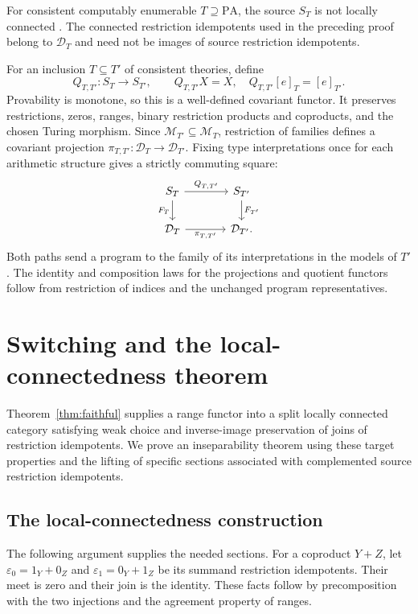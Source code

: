 \documentclass[11pt]{article}
\newcommand{\PA}{\mathrm{PA}}
\begin{document}
For consistent computably enumerable $T\supseteq\PA$, the source $S_T$
is not locally connected \cite[Corollary 4.4, pp.~657--658]{DPM}.
The connected restriction idempotents used in the preceding proof
belong to $\mathcal D_T$ and need not be images of source restriction
idempotents.

For an inclusion $T\subseteq T'$ of consistent theories, define
\[
 Q_{T,T'}:S_T\to S_{T'},\qquad
 Q_{T,T'}X=X,\quad Q_{T,T'}[e]_T=[e]_{T'}.
\]
Provability is monotone, so this is a well-defined covariant functor.
It preserves restrictions, zeros, ranges, binary restriction products
and coproducts, and the chosen Turing morphism.
Since $\mathcal M_{T'}\subseteq\mathcal M_T$, restriction of families
defines a covariant projection
$\pi_{T,T'}:\mathcal D_T\to\mathcal D_{T'}$. Fixing type interpretations
once for each arithmetic structure gives a strictly commuting square:
\[
\begin{tikzcd}[column sep=large]
 S_T \arrow[r,"Q_{T,T'}"] \arrow[d,"F_T"'] &
 S_{T'} \arrow[d,"F_{T'}"]\\
 \mathcal D_T \arrow[r,"\pi_{T,T'}"'] & \mathcal D_{T'}.
\end{tikzcd}
\]
Both paths send a program to the family of its interpretations in the
models of $T'$. The identity and composition laws for the projections
and quotient functors follow from restriction of indices and the
unchanged program representatives.

\section{Switching and the local-connectedness theorem}\label{sec:lifting}

Theorem~\ref{thm:faithful} supplies a range functor into a split locally
connected category satisfying weak choice and inverse-image preservation
of joins of restriction idempotents. We prove an inseparability theorem
using these target properties and the lifting of specific sections associated with
complemented source restriction idempotents.

\subsection{The local-connectedness construction}

The following argument supplies the needed sections.
For a coproduct $Y+Z$, let
$\varepsilon_0=1_Y+0_Z$ and $\varepsilon_1=0_Y+1_Z$ be its summand
restriction idempotents. Their meet is zero and their join is the identity. These facts
follow by precomposition with the two injections and the agreement
property of ranges.
\end{document}
